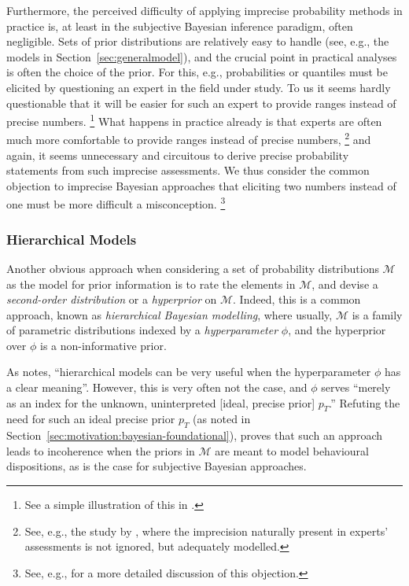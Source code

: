 Furthermore, the perceived difficulty of applying imprecise probability methods in practice
is, at least in the subjective Bayesian inference paradigm, often negligible.
Sets of prior distributions are relatively easy to handle (see, e.g., the models in Section~\ref{sec:generalmodel}),
and the crucial point in practical analyses is often the choice of the prior.
For this, e.g., probabilities or quantiles must be elicited
by questioning an expert in the field under study.
To us it seems hardly questionable that it will be easier for such an expert
to provide ranges instead of precise numbers.%
\footnote{See a simple illustration of this in \textcite[\S 5.8, footnote~7, p.~535]{1991:walley}.}
What happens in practice already is that experts are often much more comfortable to provide ranges instead of precise numbers,%
\footnote{See, e.g., the study by \textcite{2011:rinderknecht},
where the imprecision naturally present in experts' assessments is not ignored,
but adequately modelled.}
and again, it seems unnecessary and circuitous to derive precise probability statements
from such imprecise assessments.
We thus consider the common objection to imprecise Bayesian approaches
that eliciting two numbers instead of one must be more difficult a misconception.%
\footnote{See, e.g., \textcite[\S 5.8.2]{1991:walley} for a more detailed discussion of this objection.}

\subsubsection{Hierarchical Models}

Another obvious approach when considering a set of probability distributions $\mathcal{M}$
as the model for prior information is to rate the elements in $\mathcal{M}$,
and devise a \emph{second-order distribution} or a \emph{hyperprior} on $\mathcal{M}$.
Indeed, this is a common approach, known as \emph{hierarchical Bayesian modelling},
where usually, $\mathcal{M}$ is a family of parametric distributions indexed
by a \emph{hyperparameter} $\phi$, and the hyperprior over $\phi$ is a non-informative prior.

As \textcite[\S 5.10.4, p.~260]{1991:walley} notes,
``hierarchical models can be very useful when the hyperparameter $\phi$ has a clear meaning''.
However, this is very often not the case, and $\phi$ serves 
``merely as an index for the unknown, uninterpreted [ideal, precise prior] $p_T$.''
Refuting the need for such an ideal precise prior $p_T$ (as noted in Section~\ref{sec:motivation:bayesian-foundational}),
\textcite[\S 5.10.2]{1991:walley} proves that such an approach leads to incoherence
when the priors in $\mathcal{M}$ are meant to model behavioural dispositions,
as is the case for subjective Bayesian approaches.

